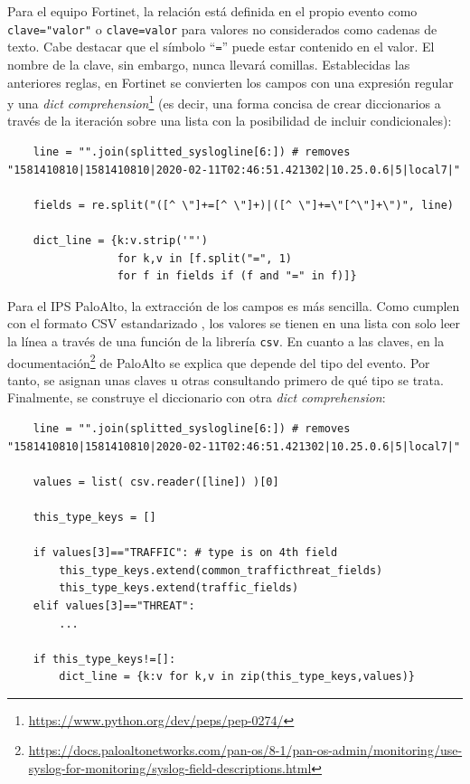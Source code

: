 Para el equipo Fortinet, la relación está definida en el propio evento como \texttt{clave="valor"} o \texttt{clave=valor} para valores no considerados como cadenas de texto.
Cabe destacar que el símbolo ``\texttt{=}'' puede estar contenido en el valor.
El nombre de la clave, sin embargo, nunca llevará comillas.
Establecidas las anteriores reglas, en Fortinet se convierten los campos con una expresión regular y una \emph{dict comprehension}\footnote{\url{https://www.python.org/dev/peps/pep-0274/}}
(es decir, una forma concisa de crear diccionarios a través de la iteración sobre una lista con la posibilidad de incluir condicionales):

\begin{verbatim}
    line = "".join(splitted_syslogline[6:]) # removes "1581410810|1581410810|2020-02-11T02:46:51.421302|10.25.0.6|5|local7|"

    fields = re.split("([^ \"]+=[^ \"]+)|([^ \"]+=\"[^\"]+\")", line)

    dict_line = {k:v.strip('"')
                 for k,v in [f.split("=", 1)
                 for f in fields if (f and "=" in f)]}
\end{verbatim}

Para el IPS PaloAlto, la extracción de los campos es más sencilla.
Como cumplen con el formato CSV estandarizado \cite{RFC4180}, los valores se tienen en una lista
con solo leer la línea a través de una función de la librería \texttt{csv}.
En cuanto a las claves, en la documentación\footnote{\url{https://docs.paloaltonetworks.com/pan-os/8-1/pan-os-admin/monitoring/use-syslog-for-monitoring/syslog-field-descriptions.html}}
de PaloAlto se explica que depende del tipo del evento.
Por tanto, se asignan unas claves u otras consultando primero de qué tipo se trata.
Finalmente, se construye el diccionario con otra \emph{dict comprehension}:

\begin{verbatim}
    line = "".join(splitted_syslogline[6:]) # removes "1581410810|1581410810|2020-02-11T02:46:51.421302|10.25.0.6|5|local7|"

    values = list( csv.reader([line]) )[0]

    this_type_keys = []

    if values[3]=="TRAFFIC": # type is on 4th field
        this_type_keys.extend(common_trafficthreat_fields)
        this_type_keys.extend(traffic_fields)
    elif values[3]=="THREAT":
        ...

    if this_type_keys!=[]:
        dict_line = {k:v for k,v in zip(this_type_keys,values)}
\end{verbatim}

